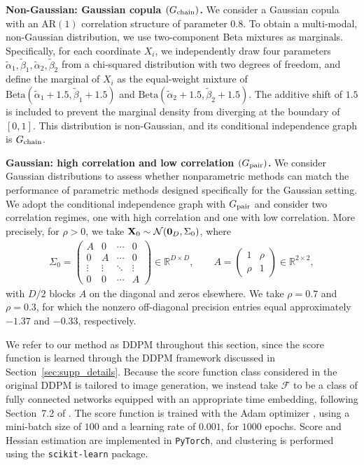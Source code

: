 \documentclass[11pt,a4paper,final]{article}
\numberwithin{equation}{section}
\theoremstyle{remark}
\def\cF{\mathcal F}
\def\cN{\mathcal N}
\newcommand{\bX}{{\bf X}}
\newcommand{\bbR}{{\mathbb R}}
\newcommand{\bean}{\setlength\arraycolsep{1pt}\begin{eqnarray*}}
\newcommand{\eean}{\end{eqnarray*}}
\begin{document}
\noindent\textbf{Non-Gaussian: Gaussian copula $(G_{\rm chain})$.}\quad
We consider a Gaussian copula with an AR$(1)$ correlation structure of parameter $0.8$.
To obtain a multi-modal, non-Gaussian distribution, we use two-component Beta mixtures as marginals.
Specifically, for each coordinate $X_i$, we independently draw four parameters $\widetilde \alpha_{1}, \widetilde \beta_{1}, \widetilde \alpha_{2}, \widetilde \beta_{2}$ from a chi-squared distribution with two degrees of freedom, and define the marginal of $X_{i}$ as the equal-weight mixture of $\mathrm{Beta}(\widetilde \alpha_1 + 1.5, \widetilde \beta_1 + 1.5)$ and $\mathrm{Beta}(\widetilde \alpha_2 + 1.5, \widetilde \beta_2 + 1.5)$.
The additive shift of $1.5$ is included to prevent the marginal density from diverging at the boundary of $[0,1]$.
This distribution is non-Gaussian, and its conditional independence graph is $G_{\rm chain}$.


\noindent\textbf{Gaussian: high correlation and low correlation $(G_{\rm pair})$.}\quad
We consider Gaussian distributions to assess whether nonparametric methods can match the performance of parametric methods designed specifically for the Gaussian setting.
We adopt the conditional independence graph with $G_{\rm pair}$ and consider two correlation regimes, one with high correlation and one with low correlation.
More precisely, for $\rho > 0$, we take $\bX_0 \sim \cN(\mathbf{0}_D, \Sigma_{0})$, where
\bean
\Sigma_{0} = \begin{pmatrix}
A & 0 & \cdots & 0 \\
0 & A & \cdots & 0 \\
\vdots & \vdots & \ddots & \vdots \\
0 & 0 & \cdots & A
\end{pmatrix} \in \bbR^{D \times D},
\qquad
A = \begin{pmatrix} 1 & \rho \\ \rho & 1 \end{pmatrix} \in \bbR^{2 \times 2},
\eean
with $D/2$ blocks $A$ on the diagonal and zeros elsewhere.
We take $\rho = 0.7$ and $\rho = 0.3$, for which the nonzero off-diagonal precision entries equal approximately $-1.37$ and $-0.33$, respectively.

We refer to our method as DDPM throughout this section, since the score function is learned through the DDPM framework discussed in Section~\ref{sec:supp_details}.
Because the score function class considered in the original DDPM is tailored to image generation, we instead take $\cF$ to be a class of fully connected networks equipped with an appropriate time embedding, following Section~7.2 of \citet{kwon2026nonparametric}.
The score function is trained with the Adam optimizer \citep{kingma2014adam}, using a mini-batch size of $100$ and a learning rate of $0.001$, for $1000$ epochs.
Score and Hessian estimation are implemented in \texttt{PyTorch}, and clustering is performed using the \texttt{scikit-learn} package.
\end{document}
